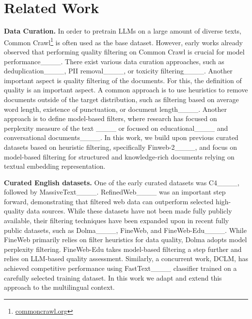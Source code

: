 \section{Related Work}
\textbf{Data Curation.} In order to pretrain LLMs on a large amount of diverse texts, Common Crawl\footnote{\href{https://commoncrawl.org/}{commoncrawl.org}} is often used as the base dataset. However, early works already observed that performing quality filtering on Common Crawl is crucial for model performance____. There exist various data curation approaches, such as deduplication____, PII removal____, or toxicity filtering____. Another important aspect is quality filtering of the documents. For this, the definition of quality is an important aspect. A common approach is to use heuristics to remove documents outside of the target distribution, such as filtering based on average word length, existence of punctuation, or document length____. Another approach is to define model-based filters, where research has focused on perplexity measure of the text ____ or focused on educational____ and conversational documents____. In this work, we build upon previous curated datasets based on heuristic filtering, specifically Finweb-2____, and focus on model-based filtering for structured and knowledge-rich documents relying on textual embedding representation.

\textbf{Curated English datasets.} One of the early curated datasets was C4____, followed by MassiveText____. RefinedWeb____ was an important step forward, demonstrating that filtered web data can outperform selected high-quality data sources. While these datasets have not been made fully publicly available, their filtering techniques have been expanded upon in recent fully public datasets, such as Dolma____, FineWeb, and FineWeb-Edu____. While FineWeb primarily relies on filter heuristics for data quality, Dolma adopts model perplexity filtering. FineWeb-Edu takes model-based filtering a step further and relies on LLM-based quality assessment. Similarly, a concurrent work, DCLM, has achieved competitive performance using FastText____ classifier trained on a carefully selected training dataset. In this work we adapt and extend this approach to the multilingual context.

